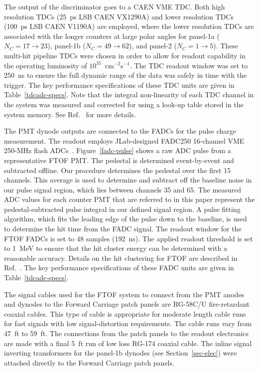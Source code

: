 \documentclass[3p,times,twocolumn]{elsarticle}
\begin{document}
The output of the discriminator goes to a CAEN VME TDC. Both high resolution TDCs (25~ps LSB CAEN
VX1290A) and lower resolution TDCs (100~ps LSB CAEN V1190A) are employed, where the lower resolution
TDCs are associated with the longer counters at large polar angles for panel-1a ($N_C = 17 \to 23$), panel-1b
($N_C = 49 \to 62$), and panel-2 ($N_C = 1 \to 5$). These multi-hit pipeline TDCs were chosen in order to
allow for readout capability in the operating luminosity of $10^{35}$~cm$^{-2}$s$^{-1}$. The TDC readout window
was set to 250~ns to ensure the full dynamic range of the data was safely in time with the trigger. The key
performance specifications of these TDC units are given in Table~\ref{tdcadc-specs}. Note that the integral
non-linearity of each TDC channel in the system was measured and corrected for using a look-up table stored in
the system memory. See Ref.~\cite{daq-nim} for more details.

The PMT dynode outputs are connected to the FADCs for the pulse charge measurement. The readout
employs JLab-designed FADC250 16-channel VME 250-MHz flash ADCs~\cite{fadc-manual}. 
Figure~\ref{fadc-pulse} shows a raw ADC pulse from a representative FTOF PMT. The pedestal is determined
event-by-event and subtracted offline. Our procedure determines the pedestal over the first 15 channels. This
average is used to determine and subtract off the baseline noise in our pulse signal region, which lies between
channels 35 and 65. The measured ADC values for each counter PMT that are referred to in this paper represent
the pedestal-subtracted pulse integral in our defined signal region. A pulse fitting algorithm, which fits the leading
edge of the pulse down to the baseline, is used to determine the hit time from the FADC signal. The readout window
for the FTOF FADCs is set to 48 samples (192~ns). The applied readout threshold is set to 1~MeV to ensure that
the hit cluster energy can be determined with a reasonable accuracy. Details on the hit clustering for FTOF are
described in Ref.~\cite{recon-nim}. The key performance specifications of these FADC units are given in
Table~\ref{tdcadc-specs}.

The signal cables used for the FTOF system to connect from the PMT anodes and dynodes to the Forward
Carriage patch panels are RG-58C/U fire-retardant coaxial cables. This type of cable is appropriate for
moderate length cable runs for fast signals with low signal-distortion requirements. The cable runs vary
from 47~ft to 59~ft. The connections from the patch panels to the readout electronics are made with a
final 5~ft run of low loss RG-174 coaxial cable. The inline signal inverting transformers for the panel-1b
dynodes (see Section~\ref{sec-elec}) were attached directly to the Forward Carriage patch panels.
\end{document}
